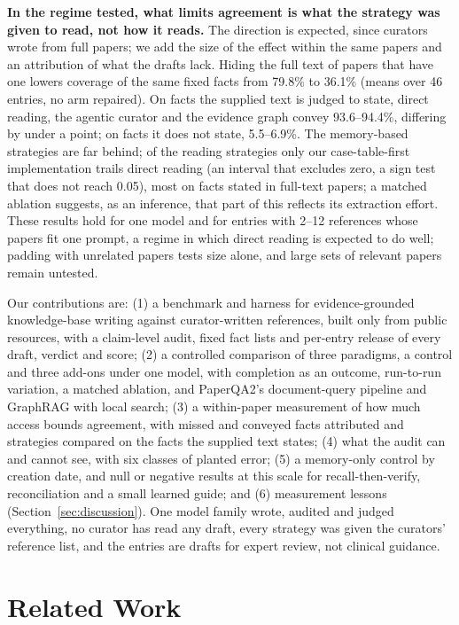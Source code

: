\documentclass{article} %
\begin{document}
\textbf{In the regime tested, what limits agreement is what the strategy was given to read, not how it reads.} The direction is expected, since curators wrote from full papers; we add the size of the effect within the same papers and an attribution of what the drafts lack. Hiding the full text of papers that have one lowers coverage of the same fixed facts from 79.8\% to 36.1\% (means over 46 entries, no arm repaired). On facts the supplied text is judged to state, direct reading, the agentic curator and the evidence graph convey 93.6--94.4\%, differing by under a point; on facts it does not state, 5.5--6.9\%. The memory-based strategies are far behind; of the reading strategies only our case-table-first implementation trails direct reading (an interval that excludes zero, a sign test that does not reach 0.05), most on facts stated in full-text papers; a matched ablation suggests, as an inference, that part of this reflects its extraction effort. These results hold for one model and for entries with 2--12 references whose papers fit one prompt, a regime in which direct reading is expected to do well; padding with unrelated papers tests size alone, and large sets of relevant papers remain untested.

Our contributions are: (1) a benchmark and harness for evidence-grounded knowledge-base writing against curator-written references, built only from public resources, with a claim-level audit, fixed fact lists and per-entry release of every draft, verdict and score; (2) a controlled comparison of three paradigms, a control and three add-ons under one model, with completion as an outcome, run-to-run variation, a matched ablation, and PaperQA2's document-query pipeline and GraphRAG with local search; (3) a within-paper measurement of how much access bounds agreement, with missed and conveyed facts attributed and strategies compared on the facts the supplied text states; (4) what the audit can and cannot see, with six classes of planted error; (5) a memory-only control by creation date, and null or negative results at this scale for recall-then-verify, reconciliation and a small learned guide; and (6) measurement lessons (Section~\ref{sec:discussion}). One model family wrote, audited and judged everything, no curator has read any draft, every strategy was given the curators' reference list, and the entries are drafts for expert review, not clinical guidance.

\section{Related Work}
\label{sec:related_work}
\end{document}
